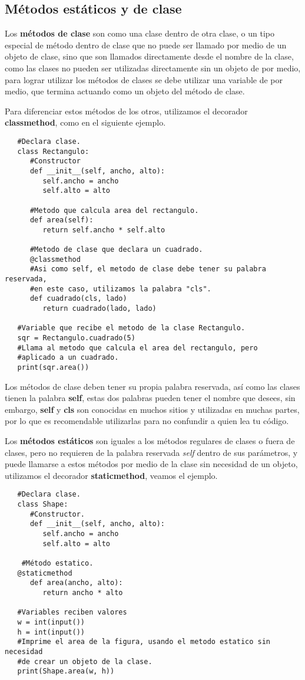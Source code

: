 \subsection{Métodos estáticos y de clase}
\hspace{0.55cm}Los \textbf{métodos de clase} son como una clase dentro de otra clase, o un tipo especial de método dentro de clase que no puede ser llamado por medio de un objeto de clase, sino que son llamados directamente desde el nombre de la clase, como las clases no pueden ser utilizadas directamente sin un objeto de por medio, para lograr utilizar los métodos de clases se debe utilizar una variable de por medio, que termina actuando como un objeto del método de clase.

Para diferenciar estos métodos de los otros, utilizamos el decorador \textbf{classmethod}, como en el siguiente ejemplo.
\begin{lstlisting}
   #Declara clase.
   class Rectangulo:
      #Constructor
      def __init__(self, ancho, alto):
         self.ancho = ancho
         self.alto = alto
      
      #Metodo que calcula area del rectangulo.
      def area(self):
         return self.ancho * self.alto
      
      #Metodo de clase que declara un cuadrado.
      @classmethod
      #Asi como self, el metodo de clase debe tener su palabra reservada,
      #en este caso, utilizamos la palabra "cls".
      def cuadrado(cls, lado)
         return cuadrado(lado, lado)
      
   #Variable que recibe el metodo de la clase Rectangulo.
   sqr = Rectangulo.cuadrado(5)
   #Llama al metodo que calcula el area del rectangulo, pero
   #aplicado a un cuadrado.
   print(sqr.area())
\end{lstlisting}

Los métodos de clase deben tener su propia palabra reservada, así como las clases tienen la palabra \textbf{self}, estas dos palabras pueden tener el nombre que desees, sin embargo, \textbf{self} y \textbf{cls} son conocidas en muchos sitios y utilizadas en muchas partes, por lo que es recomendable utilizarlas para no confundir a quien lea tu código.

Los \textbf{métodos estáticos} son iguales a los métodos regulares de clases o fuera de clases, pero no requieren de la palabra reservada \textit{self} dentro de sus parámetros, y puede llamarse a estos métodos por medio de la clase sin necesidad de un objeto, utilizamos el decorador \textbf{staticmethod}, veamos el ejemplo.
\begin{lstlisting}
   #Declara clase.
   class Shape:
      #Constructor.
      def __init__(self, ancho, alto):
         self.ancho = ancho
         self.alto = alto
    
    #Método estatico.
   @staticmethod
      def area(ancho, alto):
         return ancho * alto

   #Variables reciben valores
   w = int(input())
   h = int(input())
   #Imprime el area de la figura, usando el metodo estatico sin necesidad
   #de crear un objeto de la clase.
   print(Shape.area(w, h))
\end{lstlisting}


